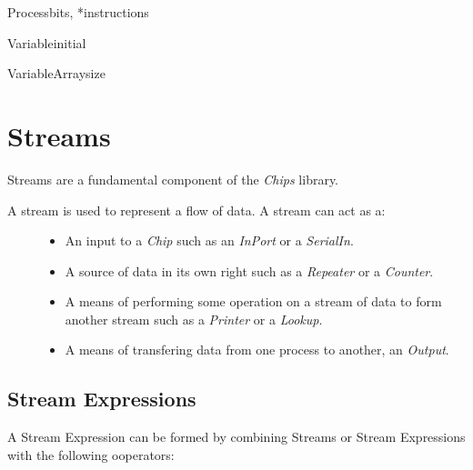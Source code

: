 \documentclass[letterpaper,10pt,english]{manual}
\begin{document}

\hypertarget{chips.Process}{}\begin{classdesc}{Process}{bits, *instructions}\end{classdesc}

\hypertarget{chips.Variable}{}\begin{classdesc}{Variable}{initial}\end{classdesc}

\hypertarget{chips.VariableArray}{}\begin{classdesc}{VariableArray}{size}\end{classdesc}


\section{Streams}
\hypertarget{module-chips.streams}{}
\modulesynopsis{}
Streams are a fundamental component of the \emph{Chips} library.
\begin{description}
\item[{A stream is used to represent a flow of data. A stream can act as a:}] \leavevmode\begin{itemize}
\item {} 
An input to a \emph{Chip} such as an \emph{InPort} or a \emph{SerialIn}.

\item {} 
A source of data in its own right such as a \emph{Repeater} or a \emph{Counter}.

\item {} 
A means of performing some operation on a stream of data to form 
another stream such as a \emph{Printer} or a \emph{Lookup}.

\item {} 
A means of transfering data from one process to another, an \emph{Output}.

\end{itemize}

\end{description}


\subsection{Stream Expressions}

A Stream Expression can be formed by combining Streams or Stream Expressions
with the following ooperators:
\end{document}
